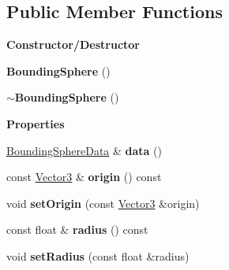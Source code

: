 \subsection*{Public Member Functions}
\begin{Indent}\textbf{ Constructor/\+Destructor}\par
\begin{DoxyCompactItemize}
\item 
\mbox{\label{classrev_1_1_bounding_sphere_aee2c7fdeec1f0af8939664363bcf249e}} 
{\bfseries Bounding\+Sphere} ()
\item 
\mbox{\label{classrev_1_1_bounding_sphere_ac169db24ed8437d1068dc3c3aef74bc9}} 
{\bfseries $\sim$\+Bounding\+Sphere} ()
\end{DoxyCompactItemize}
\end{Indent}
\begin{Indent}\textbf{ Properties}\par
\begin{DoxyCompactItemize}
\item 
\mbox{\label{classrev_1_1_bounding_sphere_ab28c8224c307374d8a4cf6c4dfbe56ed}} 
\mbox{\hyperlink{structrev_1_1_bounding_sphere_data}{Bounding\+Sphere\+Data}} \& {\bfseries data} ()
\item 
\mbox{\label{classrev_1_1_bounding_sphere_a22c1f63c994e549f8e576f7e37039f5f}} 
const \mbox{\hyperlink{classrev_1_1_vector}{Vector3}} \& {\bfseries origin} () const
\item 
\mbox{\label{classrev_1_1_bounding_sphere_a738ad66dd81d2b7bcc61a9c84497b5d8}} 
void {\bfseries set\+Origin} (const \mbox{\hyperlink{classrev_1_1_vector}{Vector3}} \&origin)
\item 
\mbox{\label{classrev_1_1_bounding_sphere_ab03a1f78a2f06b63bb9ec56c34dc2417}} 
const float \& {\bfseries radius} () const
\item 
\mbox{\label{classrev_1_1_bounding_sphere_aa5766140d4afef5110d0556d643dbb54}} 
void {\bfseries set\+Radius} (const float \&radius)
\end{DoxyCompactItemize}
\end{Indent}
